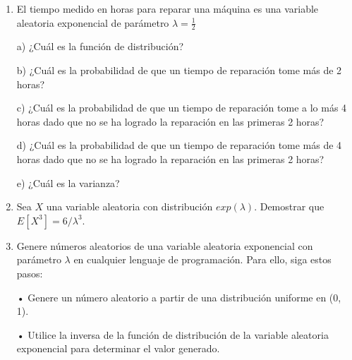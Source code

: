 \documentclass[a4paper, 12pt]{article}
\newcommand{\Pspace}{0.5cm}
\newcommand{\Aspace}{0.2cm}
\begin{document}
    \begin{enumerate}
        \item El tiempo medido en horas para reparar una máquina es una variable aleatoria exponencial de parámetro $\lambda = \frac{1}{2}$
            \vspace{\Aspace} \par
            a) ¿Cuál es la función de distribución?
            \\ { \color{azul}  }

            \vspace{\Aspace} \par
            b) ¿Cuál es la probabilidad de que un tiempo de reparación tome más de 2 horas?
            \\ { \color{azul}  }

            \vspace{\Aspace} \par
            c) ¿Cuál es la probabilidad de que un tiempo de reparación tome a lo más 4 horas dado que no se ha logrado la reparación en las primeras 2 horas?
            \\ { \color{azul}  }

            \vspace{\Aspace} \par
            d) ¿Cuál es la probabilidad de que un tiempo de reparación tome más de 4 horas dado que no se ha logrado la reparación en las primeras 2 horas?
            \\ { \color{azul}  }

            \vspace{\Aspace} \par
            e) ¿Cuál es la varianza?
            \\ { \color{azul}  }

        \vspace{\Pspace}
    \item Sea $X$ una variable aleatoria con distribución $exp(\lambda)$. Demostrar que $E[X^{3}] = 6  / \lambda^{3}$.
            \vspace{\Aspace} \par
            { \color{azul}  }

        \item Genere números aleatorios de una variable aleatoria exponencial con parámetro $\lambda$ en cualquier lenguaje de programación. Para ello, siga estos pasos: \par
        • Genere un número aleatorio a partir de una distribución uniforme en (0, 1). \par
        • Utilice la inversa de la función de distribución de la variable aleatoria exponencial para determinar el valor generado.
            \vspace{\Aspace} \par
            { \color{azul}  }
    \end{enumerate}
\end{document}
